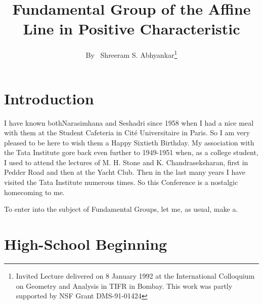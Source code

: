 \title{Fundamental Group of the Affine Line in Positive Characteristic}

\author{By~ Shreeram S. Abhyankar\footnote{Invited Lecture delivered on 8 January 1992 at the International Colloquium on Geometry and Analysis in TIFR in Bombay. This work was partly supported by NSF Grant DMS-91-01424}}

\date{}
\maketitle

\section{Introduction}

I have known both\pageoriginale Narasimhana and Seshadri since 1958 when I had a nice meal with them at the Student Cafeteria in Cit\'e Universitaire in Paris. So I am very pleased to be here to wish them a Happy Sixtieth Birthday. My association with the Tata Institute gore back even further to 1949-1951 when, as a college student, I used to attend the lectures of M. H. Stone and K. Chandraseksharan, first in Pedder Road and then at the Yacht Club. Then in the last many years I have visited the Tata Institute numerous times. So this Conference is a nostalgic homecoming to me.     

To enter into the subject of Fundamental Groups, let me, as usual, make a.

\section{High-School Beginning}

